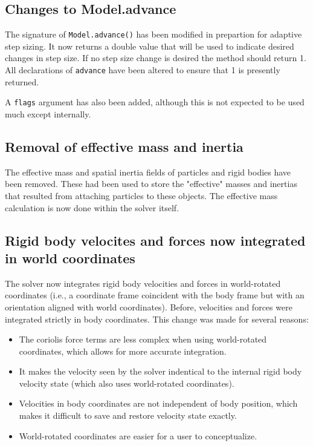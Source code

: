 \documentclass{article}
\begin{document}
\subsection*{Changes to Model.advance}

The signature of {\tt Model.advance()} has been modified in prepartion for
adaptive step sizing.  It now returns a double value that will be used
to indicate desired changes in step size. If no step size change is
desired the method should return 1.  All declarations of {\tt advance}
have been altered to ensure that 1 is presently returned.

A {\tt flags} argument has also been added, although this is not expected
to be used much except internally.

\subsection*{Removal of effective mass and inertia}

The effective mass and spatial inertia fields of particles and rigid
bodies have been removed. These had been used to store the "effective"
masses and inertias that resulted from attaching particles to these
objects.  The effective mass calculation is now done within the solver
itself.

\subsection*{Rigid body velocites and forces now integrated in world coordinates}

The solver now integrates rigid body velocities and forces in
world-rotated coordinates (i.e., a coordinate frame coincident with
the body frame but with an orientation aligned with world
coordinates).  Before, velocities and forces were integrated strictly
in body coordinates. This change was made for several reasons:

\begin{itemize}

\item The coriolis force terms are less complex when using world-rotated
  coordinates, which allows for more accurate integration.

\item It makes the velocity seen by the solver indentical to the internal
  rigid body velocity state (which also uses world-rotated
  coordinates).

\item Velocities in body coordinates are not independent of body position,
  which makes it difficult to save and restore velocity state exactly.

\item World-rotated coordinates are easier for a user to conceptualize.

\end{itemize}
\end{document}
